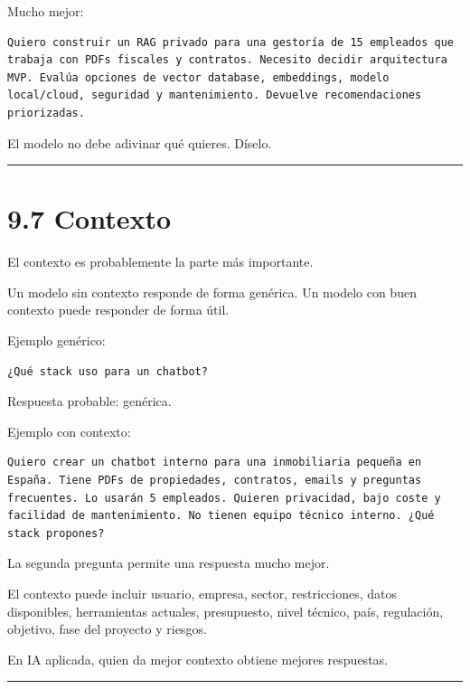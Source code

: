 Mucho mejor:

\begin{lstlisting}
Quiero construir un RAG privado para una gestoría de 15 empleados que trabaja con PDFs fiscales y contratos. Necesito decidir arquitectura MVP. Evalúa opciones de vector database, embeddings, modelo local/cloud, seguridad y mantenimiento. Devuelve recomendaciones priorizadas.
\end{lstlisting}

El modelo no debe adivinar qué quieres. Díselo.

\begin{center}\rule{0.5\linewidth}{0.5pt}\end{center}

\section{9.7 Contexto}\label{contexto-1}

El contexto es probablemente la parte más importante.

Un modelo sin contexto responde de forma genérica. Un modelo con buen
contexto puede responder de forma útil.

Ejemplo genérico:

\begin{lstlisting}
¿Qué stack uso para un chatbot?
\end{lstlisting}

Respuesta probable: genérica.

Ejemplo con contexto:

\begin{lstlisting}
Quiero crear un chatbot interno para una inmobiliaria pequeña en España. Tiene PDFs de propiedades, contratos, emails y preguntas frecuentes. Lo usarán 5 empleados. Quieren privacidad, bajo coste y facilidad de mantenimiento. No tienen equipo técnico interno. ¿Qué stack propones?
\end{lstlisting}

La segunda pregunta permite una respuesta mucho mejor.

El contexto puede incluir usuario, empresa, sector, restricciones, datos
disponibles, herramientas actuales, presupuesto, nivel técnico, país,
regulación, objetivo, fase del proyecto y riesgos.

En IA aplicada, quien da mejor contexto obtiene mejores respuestas.

\begin{center}\rule{0.5\linewidth}{0.5pt}\end{center}

